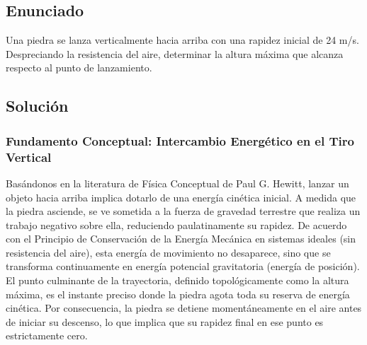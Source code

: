 \documentclass[12pt,a4paper]{article}
\begin{document}
\newpage

\subsection*{Enunciado}
Una piedra se lanza verticalmente hacia arriba con una rapidez inicial de 24 m/s. Despreciando la resistencia del aire, determinar la altura máxima que alcanza respecto al punto de lanzamiento.

\begin{center}
\end{center}

\subsection*{Solución}

\subsubsection*{Fundamento Conceptual: Intercambio Energético en el Tiro Vertical}
Basándonos en la literatura de Física Conceptual de Paul G. Hewitt, lanzar un objeto hacia arriba implica dotarlo de una energía cinética inicial. A medida que la piedra asciende, se ve sometida a la fuerza de gravedad terrestre que realiza un trabajo negativo sobre ella, reduciendo paulatinamente su rapidez. De acuerdo con el Principio de Conservación de la Energía Mecánica en sistemas ideales (sin resistencia del aire), esta energía de movimiento no desaparece, sino que se transforma continuamente en energía potencial gravitatoria (energía de posición). El punto culminante de la trayectoria, definido topológicamente como la altura máxima, es el instante preciso donde la piedra agota toda su reserva de energía cinética. Por consecuencia, la piedra se detiene momentáneamente en el aire antes de iniciar su descenso, lo que implica que su rapidez final en ese punto es estrictamente cero.
\end{document}
